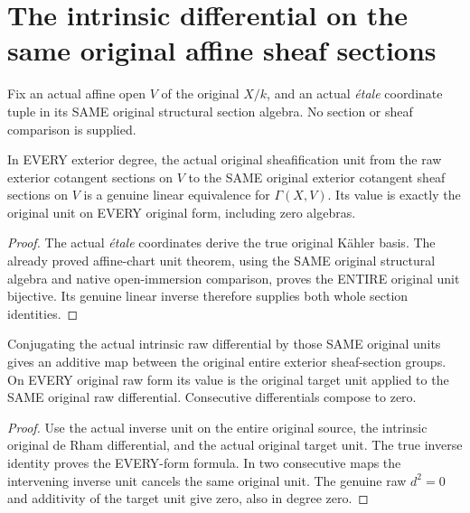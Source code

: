 \section{The intrinsic differential on the same original affine sheaf sections}
\label{sec:etale-affine-section-differential}

Fix an actual affine open $V$ of the original $X/k$, and an actual
\emph{\'etale} coordinate tuple in its SAME original structural
section algebra. No section or sheaf comparison is supplied.

\begin{lemma}
\label{lem:cartier-original-affine-section-unit}
\leanok
In EVERY exterior degree, the actual original sheafification unit
from the raw exterior cotangent sections on $V$ to the SAME original
exterior cotangent sheaf sections on $V$ is a genuine linear
equivalence for $\Gamma(X,V)$. Its value is exactly the original
unit on EVERY original form, including zero algebras.
\end{lemma}
\begin{proof}
The actual \emph{\'etale} coordinates derive the true original
K\"ahler basis. The already proved affine-chart unit theorem,
using the SAME original structural algebra and native open-immersion
comparison, proves the ENTIRE original unit bijective. Its genuine
linear inverse therefore supplies both whole section identities.
\end{proof}

\begin{theorem}
\label{thm:cartier-original-affine-section-differential}
\leanok
Conjugating the actual intrinsic raw differential by those SAME
original units gives an additive map between the original entire
exterior sheaf-section groups. On EVERY original raw form its
value is the original target unit applied to the SAME original
raw differential. Consecutive differentials compose to zero.
\end{theorem}
\begin{proof}
Use the actual inverse unit on the entire original source, the
intrinsic original de Rham differential, and the actual original
target unit. The true inverse identity proves the EVERY-form
formula. In two consecutive maps the intervening inverse unit
cancels the same original unit. The genuine raw $d^2=0$ and
additivity of the target unit give zero, also in degree zero.
\end{proof}

